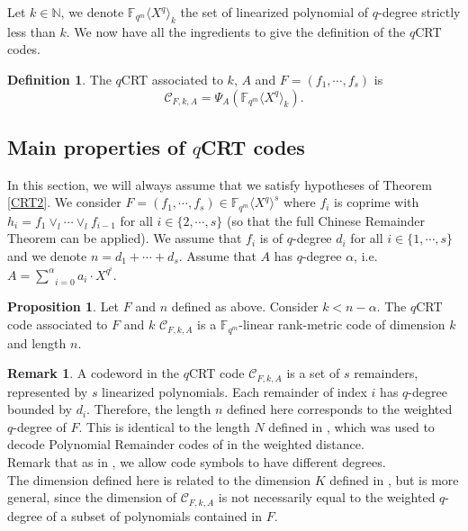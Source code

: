 \documentclass{article}
\theoremstyle{definition}
\newtheorem{proposition}[theorem]{Proposition}
\newtheorem{remark}{Remark}
\newtheorem{definition}{Definition}
\begin{document}
\noindent Let $k \in \mathbb{N}$, we denote $\mathbb{F}_{q^m} \langle X^q \rangle_k$ the set of linearized polynomial of $q$-degree strictly less than $k$.
We now have all the ingredients to give the definition of the $q$CRT codes.

\begin{definition}
      The $q$CRT associated to $k$, $A$ and $F = (f_1, \cdots, f_s)$ is
      $$ \mathcal{C}_{F, k, A} = \Psi_A (\mathbb{F}_{q^m} \langle X^q \rangle_k).$$
\end{definition}

\subsection{Main properties of $q$CRT codes}

In this section, we will always assume that we satisfy hypotheses of Theorem \ref{CRT2}. We consider $F = (f_1, \cdots, f_s) \in
      \mathbb{F}_{q^m} \langle X^q \rangle^s$ where $f_i$ is coprime with $h_i = f_1
      \vee_l \cdots \vee_l f_{i - 1}$ for all $i \in \{ 2, \cdots, s \}$ (so
that the full Chinese Remainder Theorem can be applied). We assume that $f_i$ is
of $q$-degree $d_i$ for all $i \in \{ 1, \cdots, s \}$ and we denote $n = d_1
      + \cdots + d_s$. Assume that $A$ has $q$-degree $\alpha$, i.e. $A =
      \underset{i = 0}{\overset{\alpha}{\sum}} a_i \cdot X^{q^i}$.


\begin{proposition}
      Let $F$ and $n$ defined as above.
      Consider $k < n - \alpha$. The $q$CRT code associated to $F$ and $k$ $\mathcal{C}_{F, k,A}$
      is a $\mathbb{F}_{q^m}$-linear rank-metric code of dimension $k$ and length $n$.
\end{proposition}
\color{black}


\begin{remark}
      A codeword in the $q$CRT code $\mathcal{C}_{F, k,A}$ is a set of $s$ remainders, represented by $s$ linearized polynomials. Each remainder of index $i$ has $q$-degree bounded by $d_i$. Therefore, the length $n$ defined here corresponds to the weighted $q$-degree of $F$. This is identical to the length $N$ defined in \cite{yu_polynomial_2012}, which was used to decode Polynomial Remainder codes of \cite{yu_polynomial_2012} in the weighted distance. \\
      Remark that as in \cite{yu_polynomial_2012}, we allow code symbols to have different degrees. \\
      The dimension defined here is related to the dimension $K$ defined in \cite{yu_polynomial_2012}, but is more general, since the dimension of $\mathcal{C}_{F, k,A}$ is not necessarily equal to the weighted $q$-degree of a subset of polynomials contained in $F$.
\end{remark}
\color{black}
\end{document}
